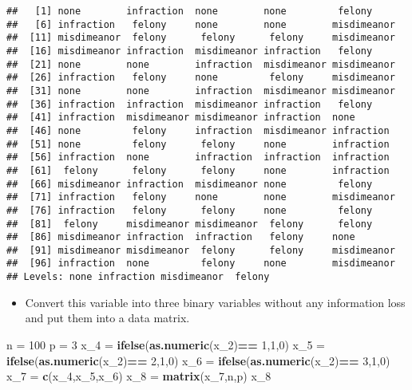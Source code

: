 \documentclass[]{article}
\newenvironment{Shaded}{\begin{snugshade}}{\end{snugshade}}
\newcommand{\KeywordTok}[1]{\textcolor[rgb]{0.13,0.29,0.53}{\textbf{#1}}}
\newcommand{\DecValTok}[1]{\textcolor[rgb]{0.00,0.00,0.81}{#1}}
\newcommand{\StringTok}[1]{\textcolor[rgb]{0.31,0.60,0.02}{#1}}
\newcommand{\OperatorTok}[1]{\textcolor[rgb]{0.81,0.36,0.00}{\textbf{#1}}}
\newcommand{\NormalTok}[1]{#1}
\providecommand{\tightlist}{%
  \setlength{\itemsep}{0pt}\setlength{\parskip}{0pt}}
\begin{document}
\begin{verbatim}
##   [1] none        infraction  none        none         felony    
##   [6] infraction   felony     none        none        misdimeanor
##  [11] misdimeanor  felony      felony      felony     misdimeanor
##  [16] misdimeanor infraction  misdimeanor infraction   felony    
##  [21] none        none        infraction  misdimeanor misdimeanor
##  [26] infraction   felony     none         felony     misdimeanor
##  [31] none        none        infraction  misdimeanor misdimeanor
##  [36] infraction  infraction  misdimeanor infraction   felony    
##  [41] infraction  misdimeanor misdimeanor infraction  none       
##  [46] none         felony     infraction  misdimeanor infraction 
##  [51] none         felony      felony     none        infraction 
##  [56] infraction  none        infraction  infraction  infraction 
##  [61]  felony      felony      felony     none        infraction 
##  [66] misdimeanor infraction  misdimeanor none         felony    
##  [71] infraction   felony     none        none        misdimeanor
##  [76] infraction   felony      felony     none         felony    
##  [81]  felony     misdimeanor misdimeanor  felony      felony    
##  [86] misdimeanor infraction  infraction   felony     none       
##  [91] misdimeanor misdimeanor  felony      felony     misdimeanor
##  [96] infraction  none         felony     none        misdimeanor
## Levels: none infraction misdimeanor  felony
\end{verbatim}

\begin{itemize}
\tightlist
\item
  Convert this variable into three binary variables without any
  information loss and put them into a data matrix.
\end{itemize}

\begin{Shaded}
\begin{Highlighting}[]
\NormalTok{n =}\StringTok{ }\DecValTok{100}
\NormalTok{p =}\StringTok{ }\DecValTok{3}
\NormalTok{x_}\DecValTok{4}\NormalTok{ =}\StringTok{ }\KeywordTok{ifelse}\NormalTok{(}\KeywordTok{as.numeric}\NormalTok{(x_}\DecValTok{2}\NormalTok{)}\OperatorTok{==}\StringTok{ }\DecValTok{1}\NormalTok{,}\DecValTok{1}\NormalTok{,}\DecValTok{0}\NormalTok{)}
\NormalTok{x_}\DecValTok{5}\NormalTok{ =}\StringTok{ }\KeywordTok{ifelse}\NormalTok{(}\KeywordTok{as.numeric}\NormalTok{(x_}\DecValTok{2}\NormalTok{)}\OperatorTok{==}\StringTok{ }\DecValTok{2}\NormalTok{,}\DecValTok{1}\NormalTok{,}\DecValTok{0}\NormalTok{)}
\NormalTok{x_}\DecValTok{6}\NormalTok{ =}\StringTok{ }\KeywordTok{ifelse}\NormalTok{(}\KeywordTok{as.numeric}\NormalTok{(x_}\DecValTok{2}\NormalTok{)}\OperatorTok{==}\StringTok{ }\DecValTok{3}\NormalTok{,}\DecValTok{1}\NormalTok{,}\DecValTok{0}\NormalTok{)}
\NormalTok{x_}\DecValTok{7}\NormalTok{ =}\StringTok{ }\KeywordTok{c}\NormalTok{(x_}\DecValTok{4}\NormalTok{,x_}\DecValTok{5}\NormalTok{,x_}\DecValTok{6}\NormalTok{)}
\NormalTok{x_}\DecValTok{8}\NormalTok{ =}\StringTok{ }\KeywordTok{matrix}\NormalTok{(x_}\DecValTok{7}\NormalTok{,n,p)}
\NormalTok{x_}\DecValTok{8}
\end{Highlighting}
\end{Shaded}
\end{document}
